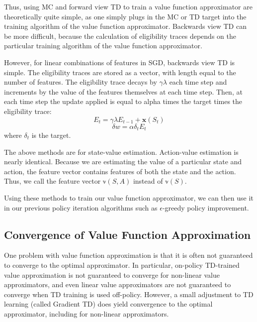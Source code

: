 \documentclass{article}
\newcommand{\eps}{\epsilon}
\begin{document}
Thus, using MC and forward view TD to train a value function approximator are theoretically quite simple, as one simply plugs in the MC or TD target into the training algorithm of the value function approximator. Backwards view TD can be more difficult, because the calculation of eligibility traces depends on the particular training algorithm of the value function approximator.

However, for linear combinations of features in SGD, backwards view TD is simple. The eligibility traces are stored as a vector, with length equal to the number of features. The eligibility trace decays by $\gamma\lambda$ each time step and increments by the value of the features themselves at each time step. Then, at each time step the update applied is equal to alpha times the target times the eligibility trace:
\begin{equation}\label{eq:incremental_eligibility_trace_update}
E_t = \gamma\lambda E_{t-1} + \mathbf{x}(S_t)
\end{equation}
\begin{equation}\label{eq:backwards_td_state_value_estimation_update}
\delta w = \alpha\delta_t E_t
\end{equation}
where $\delta_t$ is the target.

The above methods are for state-value estimation. Action-value estimation is nearly identical. Because we are estimating the value of a particular state and action, the feature vector contains features of both the state and the action. Thus, we call the feature vector $\mathbb{v}(S, A)$ instead of $\mathbb{v}(S)$.

Using these methods to train our value function approximator, we can then use it in our previous policy iteration algorithms such as $\eps$-greedy policy improvement.

\subsection{Convergence of Value Function Approximation}

One problem with value function approximation is that it is often not guaranteed to converge to the optimal approximator. In particular, on-policy TD-trained value approximation is not guaranteed to converge for non-linear value approximators, and even linear value approximators are not guaranteed to converge when TD training is used off-policy. However, a small adjustment to TD learning (called Gradient TD) does yield convergence to the optimal approximator, including for non-linear approximators.
\end{document}
